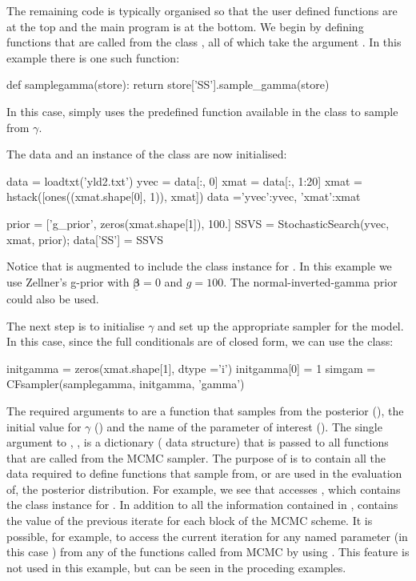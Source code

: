 \documentclass[article]{jss}
\begin{document}
The remaining code is typically organised so that the user defined
functions are at the top and the main program is at the bottom.  We
begin by defining functions that are called from the class
, all of which take the argument . In this
example there is one such function:

\begin{Code}
def samplegamma(store):
    return store['SS'].sample_gamma(store)
\end{Code}
In this case,  simply uses the predefined function
available in the  class to sample from
$\gamma$. 

The data and an instance of the class  are now
initialised:
\begin{Code}
data = loadtxt('yld2.txt')
yvec = data[:, 0]
xmat = data[:, 1:20]
xmat = hstack([ones((xmat.shape[0], 1)), xmat])
data ={'yvec':yvec, 'xmat':xmat}

prior = ['g_prior', zeros(xmat.shape[1]), 100.]
SSVS = StochasticSearch(yvec, xmat, prior);
data['SS'] = SSVS
\end{Code}


Notice that  is augmented to include the class instance for
.  In this example we use Zellner's g-prior with
$\bm{\underline{\beta}} = 0$ and $g=100$. The normal-inverted-gamma
prior could also be used.

The next step is to initialise $\gamma$ and set up the appropriate
sampler for the model. In this case, since the full conditionals are
of closed form, we can use the  class:

\begin{Code}
initgamma = zeros(xmat.shape[1], dtype ='i')
initgamma[0] = 1
simgam = CFsampler(samplegamma, initgamma, 'gamma')
\end{Code}

The required arguments to  are a function that samples
from the posterior \newline (), the initial value
for $\gamma$ () and the name of the parameter of
interest (). The single argument to ,
, is a dictionary ( data structure) that
is passed to all functions that are called from the MCMC sampler.  The
purpose of  is to contain all the data required to define
functions that sample from, or are used in the evaluation of, the
posterior distribution. For example, we see that 
accesses , which contains the class instance for
. In addition to all the information contained
in ,  contains the value of the previous
iterate for each block of the MCMC scheme. It is possible, for
example, to access the current iteration for any named parameter (in
this case ) from any of the functions called from MCMC
by using . This feature is not used in this
example, but can be seen in the proceding examples.
\end{document}
